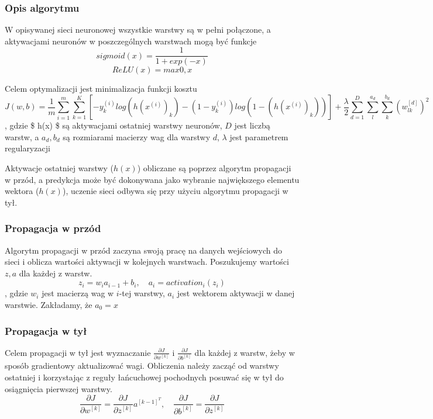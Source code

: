 \documentclass[11pt]{article}
\begin{document}
\hypertarget{opis-algorytmu}{%
\subsubsection{Opis algorytmu}\label{opis-algorytmu}}

W opisywanej sieci neuronowej wszystkie warstwy są w pełni połączone, a
aktywacjami neuronów w poszczególnych warstwach mogą być funkcje
\[ sigmoid(x) = \frac{1}{1 + exp(-x)} \] \[ ReLU(x) = max{0, x} \]

Celem optymalizacji jest minimalizacja funkcji kosztu
\[ J(w, b) = \frac{1}{m} \sum^m_{i=1} \sum^K_{k=1} [-y_k^{(i)} log (h(x^{(i)})_k) - (1 - y^{(i)}_k) log (1 - (h(x^{(i)})_k))] + \frac{\lambda}{2}\sum^D_{d=1} \sum^{a_{d}}_l \sum^{b_{d}}_k (w^{[d]}_{lk})^2 \],
gdzie \$ h(x) \$ są aktywacjami ostatniej warstwy neuronów, \(D\) jest
liczbą warstw, a \(a_d, b_d\) są rozmiarami macierzy wag dla warstwy
\(d\), \(\lambda\) jest parametrem regularyzacji

Aktywacje ostatniej warstwy (\(h(x)\)) obliczane są poprzez algorytm
propagacji w przód, a predykcja może być dokonywana jako wybranie
największego elementu wektora (\(h(x)\)), uczenie sieci odbywa się przy
użyciu algorytmu propagacji w tył.

\hypertarget{propagacja-w-przuxf3d}{%
\subsubsection{Propagacja w przód}\label{propagacja-w-przuxf3d}}

Algorytm propagacji w przód zaczyna swoją pracę na danych wejściowych do
sieci i oblicza wartości aktywacji w kolejnych warstwach. Poszukujemy
wartości \(z, a\) dla każdej z warstw.
\[z_i = w_i a_{i-1} + b_i, \quad a_i = activation_i(z_i)\], gdzie
\(w_i\) jest macierzą wag w \(i\)-tej warstwy, \(a_i\) jest wektorem
aktywacji w danej warstwie. Zakładamy, że \(a_0 = x\)

\hypertarget{propagacja-w-tyux142}{%
\subsubsection{Propagacja w tył}\label{propagacja-w-tyux142}}

Celem propagacji w tył jest wyznaczanie
\(\frac{\partial J}{\partial w^{[k]}}\) i
\(\frac{\partial J}{\partial b^{[k]}}\) dla każdej z warstw, żeby w
sposób gradientowy aktualizować wagi. Obliczenia należy zacząć od
warstwy ostatniej i korzystając z reguły łańcuchowej pochodnych posuwać
się w tył do osiągnięcia pierwszej warstwy.
\[ \frac{\partial J}{\partial w^{[k]}} = \frac{\partial J}{\partial z^{[k]}} a^{[k-1]^T}, \quad \frac{\partial J}{\partial b^{[k]}} = \frac{\partial J}{\partial z^{[k]}} \]
\end{document}
